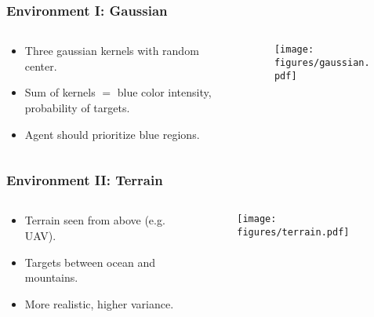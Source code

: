 \begin{frame}
    \frametitle{Environment I: Gaussian}
    \begin{columns}
        \begin{column}{0.5\textwidth}
            \begin{itemize}
                \item Three gaussian kernels with random center.
                \item Sum of kernels \(=\) blue color intensity, probability of targets.
                \item Agent should prioritize blue regions.
            \end{itemize}
        \end{column}
        \begin{column}{0.5\textwidth}
            \begin{figure}
                \centering
                \texttt{[image: figures/gaussian.pdf]}
            \end{figure}
        \end{column}
    \end{columns}    
\end{frame}

\begin{frame}
    \frametitle{Environment II: Terrain}
    \begin{columns}
        \begin{column}{0.5\textwidth}
            \begin{itemize}
                \item Terrain seen from above (e.g. UAV).
                \item Targets between ocean and mountains.
                \item More realistic, higher variance.
            \end{itemize}
        \end{column}
        \begin{column}{0.5\textwidth}
            \begin{figure}
                \centering
                \texttt{[image: figures/terrain.pdf]}
            \end{figure}
        \end{column}
    \end{columns}   
\end{frame}

